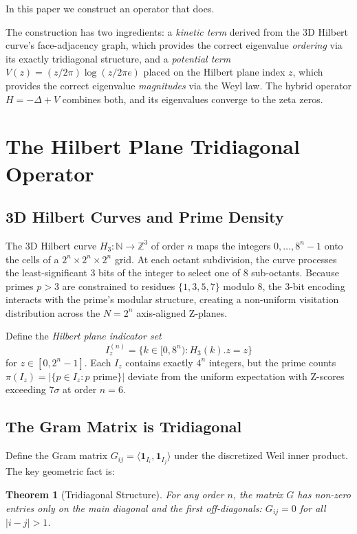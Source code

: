 \documentclass[11pt,a4paper]{article}
\newtheorem{theorem}{Theorem}[section]
\theoremstyle{definition}
\begin{document}
In this paper we construct an operator that does.

The construction has two ingredients: a \emph{kinetic term} derived
from the 3D Hilbert curve's face-adjacency graph, which provides the
correct eigenvalue \emph{ordering} via its exactly tridiagonal
structure, and a \emph{potential term} $V(z) = (z/2\pi)\log(z/2\pi e)$
placed on the Hilbert plane index $z$, which provides the correct
eigenvalue \emph{magnitudes} via the Weyl law. The hybrid operator
$H = -\Delta + V$ combines both, and its eigenvalues converge to
the zeta zeros.

\section{The Hilbert Plane Tridiagonal Operator}

\subsection{3D Hilbert Curves and Prime Density}

The 3D Hilbert curve $H_3: \mathbb{N} \to \mathbb{Z}^3$ of order $n$
maps the integers $0,\ldots,8^n-1$ onto the cells of a
$2^n \times 2^n \times 2^n$ grid. At each octant subdivision, the
curve processes the least-significant 3 bits of the integer to select
one of 8 sub-octants. Because primes $p > 3$ are constrained to
residues $\{1,3,5,7\}$ modulo 8, the 3-bit encoding interacts with
the prime's modular structure, creating a non-uniform visitation
distribution across the $N = 2^n$ axis-aligned Z-planes.

Define the \emph{Hilbert plane indicator set}
\[
I_z^{(n)} = \{k \in [0, 8^n) : H_3(k).z = z\}
\]
for $z \in [0, 2^n-1]$. Each $I_z$ contains exactly $4^n$ integers,
but the prime counts $\pi(I_z) = |\{p \in I_z : p \text{ prime}\}|$
deviate from the uniform expectation with Z-scores exceeding $7\sigma$
at order $n=6$.

\subsection{The Gram Matrix is Tridiagonal}

Define the Gram matrix $G_{ij} = \langle \mathbf{1}_{I_i},
\mathbf{1}_{I_j} \rangle$ under the discretized Weil inner product.
The key geometric fact is:

\begin{theorem}[Tridiagonal Structure]
For any order $n$, the matrix $G$ has non-zero entries only on the main
diagonal and the first off-diagonals: $G_{ij} = 0$ for all $|i-j| > 1$.
\end{theorem}
\end{document}
